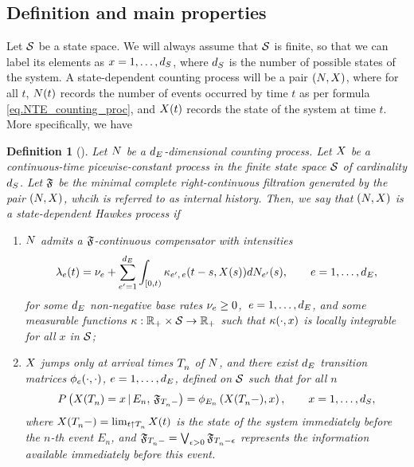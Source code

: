 \documentclass[10pt, article,table]{article}
\newtheorem{defi}[thm]{Definition}
\begin{document}
\subsection{Definition and main properties}\label{sec.sdHawkes_def_and_props}
Let $\stateSpace$ be a state space. We will always assume that $\stateSpace$ is finite, so that we can label its elements as $x=1, \dots, \numStates$, where $\numStates$ is the number of possible states of the system. A state-dependent counting process will be a pair $(\multiCountingProc, \stateVariable)$, where for all $t$, $\multiCountingProc(t)$ records the number of events occurred by time $t$ as per formula \eqref{eq.NTE_counting_proc}, and $\stateVariable(t)$ records the state of the system at time $t$. More specifically, we have
\begin{defi}[{\citealp[Definition 2.1]{MP18sta}}]\label{def.sdHawkes}
 Let $\multiCountingProc$ be a $\numEventTypes$-dimensional counting process. Let $\stateVariable$ be a continuous-time picewise-constant process in the finite state space $\stateSpace$ of cardinality $\numStates$. Let $\internalHistory$ be the minimal complete right-continuous filtration generated by the pair $(\multiCountingProc, \stateVariable)$, whcih is referred to as internal history. Then, we say that $(\multiCountingProc, \stateVariable)$ is a state-dependent Hawkes process if 
 \begin{enumerate}
  \item $\multiCountingProc$ admits a $\internalHistory$-continuous compensator with intensities
  \begin{equation}\label{eq.intensity_of_sdHawkes}
   \intensity(t) = \baseRate_e + \sum_{\eone=1}^{\numEventTypes}\int_{[0,t)} \hawkesKernel\subscriptee(t-s, \stateVariable(s))d\countingProc[\eone](s), \qquad e=1,\dots,\numEventTypes,
  \end{equation}
  for some $\numEventTypes$ non-negative base rates $\baseRate_e\geq 0$, $\, e=1, \dots, \numEventTypes$, and some measurable functions $\hawkesKernel: \R_+ \times \stateSpace \rightarrow \R_+$ such that $\hawkesKernel(\cdot, x)$ is locally integrable for all $x$ in $\stateSpace$;
  \item $\stateVariable$ jumps only at arrival times $\arrivalTimes[ ]_{n}$ of $\multiCountingProc$, and there exist $\numEventTypes$ transition matrices $\transProb_e(\cdot,\cdot)$, $e=1,\dots, \numEventTypes$, defined on $\stateSpace$ such that for all $n$
  \begin{equation}\label{eq.markov_update_stateVariable}
   \Prob\left( \stateVariable(\arrivalTimes[ ]_{n})=x \,  \vert \,  E_n, \, \internalHistory_{\arrivalTimes[ ]_{n}-} \right)
   =
   \transProb_{E_n}\left(\stateVariable(\arrivalTimes[ ]_{n}-),x\right),
   \qquad
   x=1, \dots, \numStates,
  \end{equation}
  where $\stateVariable(\arrivalTimes[ ]_{n}- ) = \lim_{t\uparrow \arrivalTimes[ ]_{n}} \stateVariable(t)$ is the state of the system immediately before the $n$-th event $E_n$, and $\internalHistory_{\arrivalTimes[ ]_{n}-} = \bigvee_{\epsilon>0} \internalHistory_{\arrivalTimes[ ]_{n} - \epsilon}$ represents the information available immediately before this event.
 \end{enumerate}
\end{defi}
\end{document}

